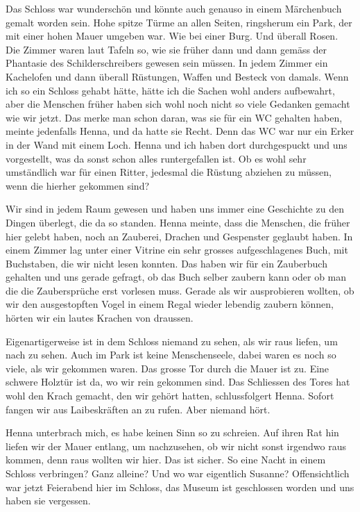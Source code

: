 Das Schloss war wunderschön und könnte auch genauso in einem Märchenbuch gemalt worden sein. Hohe spitze Türme an allen Seiten, ringsherum ein Park, der mit einer hohen Mauer umgeben war. Wie bei einer Burg. Und überall Rosen. Die Zimmer waren laut Tafeln so, wie sie früher dann und dann gemäss der Phantasie des Schilderschreibers gewesen sein müssen. In jedem Zimmer ein Kachelofen und dann überall Rüstungen, Waffen und Besteck von damals. Wenn ich so ein Schloss gehabt hätte, hätte ich die Sachen wohl anders aufbewahrt, aber die Menschen früher haben sich wohl noch nicht so viele Gedanken gemacht wie wir jetzt. Das merke man schon daran, was sie für ein WC gehalten haben, meinte jedenfalls Henna, und da hatte sie Recht. Denn das WC war nur ein Erker in der Wand mit einem Loch. Henna und ich haben dort durchgespuckt und uns vorgestellt, was da sonst schon alles runtergefallen ist. Ob es wohl sehr umständlich war für einen Ritter, jedesmal die Rüstung abziehen zu müssen, wenn die hierher gekommen sind?

Wir sind in jedem Raum gewesen und haben uns immer eine Geschichte zu den Dingen überlegt, die da so standen. Henna meinte, dass die Menschen, die früher hier gelebt haben, noch an Zauberei, Drachen und Gespenster geglaubt haben. In einem Zimmer lag unter einer Vitrine ein sehr grosses aufgeschlagenes Buch, mit Buchstaben, die wir nicht lesen konnten. Das haben wir für ein Zauberbuch gehalten und uns gerade gefragt, ob das Buch selber zaubern kann oder ob man die die Zaubersprüche erst vorlesen muss. Gerade als wir ausprobieren wollten, ob wir den ausgestopften Vogel in einem Regal wieder lebendig zaubern können, hörten wir ein lautes Krachen von draussen.

Eigenartigerweise ist in dem Schloss niemand zu sehen, als wir raus liefen, um nach zu sehen. Auch im Park ist keine Menschenseele, dabei waren es noch so viele, als wir gekommen waren. Das grosse Tor durch die Mauer ist zu. Eine schwere Holztür ist da, wo wir rein gekommen sind. Das Schliessen des Tores hat wohl den Krach gemacht, den wir gehört hatten, schlussfolgert Henna. Sofort fangen wir aus Laibeskräften an zu rufen. Aber niemand hört.

Henna unterbrach mich, es habe keinen Sinn so zu schreien. Auf ihren Rat hin liefen wir der Mauer entlang, um nachzusehen, ob wir nicht sonst irgendwo raus kommen, denn raus wollten wir hier. Das ist sicher. So eine Nacht in einem Schloss verbringen? Ganz alleine? Und wo war eigentlich Susanne? Offensichtlich war jetzt Feierabend hier im Schloss, das Museum ist geschlossen worden und uns haben sie vergessen.

